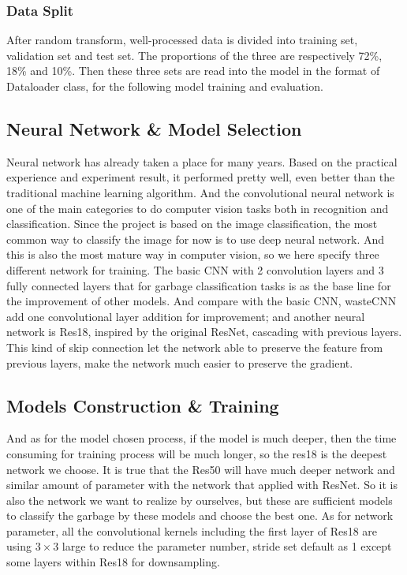 \documentclass{article}
\begin{document}
        \subsubsection*{Data Split}
        After random transform, well-processed data is divided into training set, validation set and test set. The proportions of the three are respectively 72\%, 18\% and 10\%. Then these three sets are read into the model in the format of Dataloader class, for the following model training and evaluation.
    

    \subsection*{Neural Network \& Model Selection}
    Neural network has already taken a place for many years. Based on the practical experience and experiment result, it performed pretty well, even better than the traditional machine learning algorithm. And the convolutional neural network is one of the main categories to do computer vision tasks both in recognition and classification. Since the project is based on the image classification, the most common way to classify the image for now is to use deep neural network. And this is also the most mature way in computer vision, so we here specify three different network for training.
    The basic CNN with 2 convolution layers and 3 fully connected layers that for garbage classification tasks is as the base line for the improvement of other models. And compare with the basic CNN, wasteCNN add one convolutional layer addition for improvement; and another neural network is Res18, inspired by the original ResNet\cite{he2016deep}, cascading with previous layers. This kind of skip connection let the network able to preserve the feature from previous layers, make the network much easier to preserve the gradient.


    \subsection*{Models Construction \& Training}
    And as for the model chosen process, if the model is much deeper, then the time consuming for training process will be much longer, so the res18 is the deepest network we choose. It is true that the Res50 will have much deeper network and similar amount of parameter with the network that applied with ResNet. So it is also the network we want to realize by ourselves, but these are sufficient models to classify the garbage by these models and choose the best one. As for network parameter, all the convolutional kernels including the first layer of Res18 are using $3\times3$ large to reduce the parameter number, stride set default as 1 except some layers within Res18 for downsampling.
    
\end{document}

